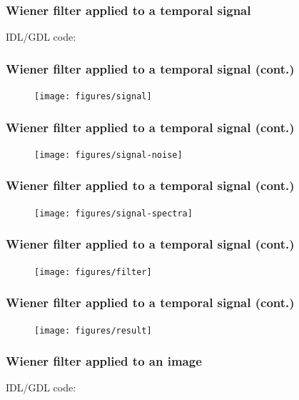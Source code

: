 \documentclass[10pt]{beamer}
\begin{document}
\begin{frame}
  \frametitle{Wiener filter applied to a temporal signal}
  IDL/GDL code:
  
\end{frame}

\begin{frame}
  \frametitle{Wiener filter applied to a temporal signal (cont.)}
  \begin{figure}
    \centering
    \texttt{[image: figures/signal]}
  \end{figure}
\end{frame}

\begin{frame}
  \frametitle{Wiener filter applied to a temporal signal (cont.)}
  \begin{figure}
    \centering
    \texttt{[image: figures/signal-noise]}
  \end{figure}
\end{frame}

\begin{frame}
  \frametitle{Wiener filter applied to a temporal signal (cont.)}
  \begin{figure}
    \centering
    \texttt{[image: figures/signal-spectra]}
  \end{figure}
\end{frame}

\begin{frame}
  \frametitle{Wiener filter applied to a temporal signal (cont.)}
  \begin{figure}
    \centering
    \texttt{[image: figures/filter]}
  \end{figure}
\end{frame}

\begin{frame}
  \frametitle{Wiener filter applied to a temporal signal (cont.)}
  \begin{figure}
    \centering
    \texttt{[image: figures/result]}
  \end{figure}
\end{frame}

\begin{frame}
  \frametitle{Wiener filter applied to an image}
  IDL/GDL code:
  
\end{frame}
\end{document}
